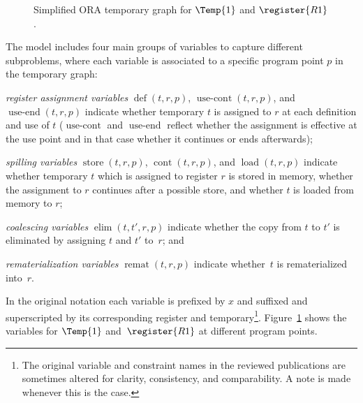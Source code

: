\documentclass[acmsmall,authorversion,nonacm]{acmart}
\newcommand{\noMathVar}[2]{\operatorname{#1}(#2)}
\newcommand{\var}[2]{$\noMathVar{#1}{#2}$}
\begin{document}
\begin{figure}
{
 }
  \caption{Simplified ORA temporary graph for $\Temp{1}$ and
    $\register{R1}$.}
  \label{fig:ora-example}
\end{figure}

The model includes four main groups of variables to capture different
subproblems, where each variable is associated to a specific program
point $p$ in the temporary graph:
\begin{inparaitem}[]
\item \emph{register assignment variables} \var{def}{t,r,p},
  \var{use-cont}{t,r,p}, and \var{use-end}{t,r,p} indicate whether
  temporary $t$ is assigned to $r$ at each definition and use of $t$
  ($\operatorname{use-cont}$ and $\operatorname{use-end}$ reflect
  whether the assignment is effective at the use point and in that
  case whether it continues or ends afterwards);
\item \emph{spilling variables} \var{store}{t,r,p}, \var{cont}{t,r,p},
  and \var{load}{t,r,p} indicate whether temporary $t$ which is
  assigned to register $r$ is stored in memory, whether the assignment
  to $r$ continues after a possible store, and whether $t$ is loaded
  from memory to $r$;
\item \emph{coalescing variables} \var{elim}{t,t',r,p} indicate
  whether the copy from $t$ to $t'$ is eliminated by assigning $t$ and
  $t'$ to~$r$; and
\item \emph{rematerialization variables} \var{remat}{t,r,p} indicate
  whether~$t$ is rematerialized into~$r$.
\end{inparaitem}
In the original notation each variable is prefixed by $x$ and suffixed
and superscripted by its corresponding register and
temporary\footnote{The original variable and constraint names in the
  reviewed publications are sometimes altered for clarity,
  consistency, and comparability.
A note is made whenever this is the case.}.
Figure~\ref{fig:ora-example} shows the variables for $\Temp{1}$
and~$\register{R1}$ at different program points.
\end{document}
